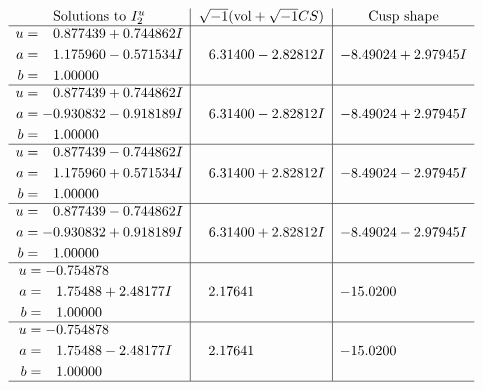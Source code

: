 \documentclass[1p]{elsarticle_modified}
\theoremstyle{definition}
\newcommand{\I}{\sqrt{-1}}
\begin{document}
$$\begin{array}{c|c|c}  
\text{Solutions to }I^u_{2}& \I (\text{vol} + \sqrt{-1}CS) & \text{Cusp shape}\\
 \hline 
\begin{aligned}
u &= \phantom{-}0.877439 + 0.744862 I \\
a &= \phantom{-}1.175960 - 0.571534 I \\
b &= \phantom{-}1.00000\phantom{ +0.000000I}\end{aligned}
 & \phantom{-}6.31400 - 2.82812 I & -8.49024 + 2.97945 I \\ \hline\begin{aligned}
u &= \phantom{-}0.877439 + 0.744862 I \\
a &= -0.930832 - 0.918189 I \\
b &= \phantom{-}1.00000\phantom{ +0.000000I}\end{aligned}
 & \phantom{-}6.31400 - 2.82812 I & -8.49024 + 2.97945 I \\ \hline\begin{aligned}
u &= \phantom{-}0.877439 - 0.744862 I \\
a &= \phantom{-}1.175960 + 0.571534 I \\
b &= \phantom{-}1.00000\phantom{ +0.000000I}\end{aligned}
 & \phantom{-}6.31400 + 2.82812 I & -8.49024 - 2.97945 I \\ \hline\begin{aligned}
u &= \phantom{-}0.877439 - 0.744862 I \\
a &= -0.930832 + 0.918189 I \\
b &= \phantom{-}1.00000\phantom{ +0.000000I}\end{aligned}
 & \phantom{-}6.31400 + 2.82812 I & -8.49024 - 2.97945 I \\ \hline\begin{aligned}
u &= -0.754878\phantom{ +0.000000I} \\
a &= \phantom{-}1.75488 + 2.48177 I \\
b &= \phantom{-}1.00000\phantom{ +0.000000I}\end{aligned}
 & \phantom{-}2.17641\phantom{ +0.000000I} & -15.0200\phantom{ +0.000000I} \\ \hline\begin{aligned}
u &= -0.754878\phantom{ +0.000000I} \\
a &= \phantom{-}1.75488 - 2.48177 I \\
b &= \phantom{-}1.00000\phantom{ +0.000000I}\end{aligned}
 & \phantom{-}2.17641\phantom{ +0.000000I} & -15.0200\phantom{ +0.000000I}\\
 \hline 
 \end{array}$$\newpage\newpage\renewcommand{\arraystretch}{1}
\end{document}
